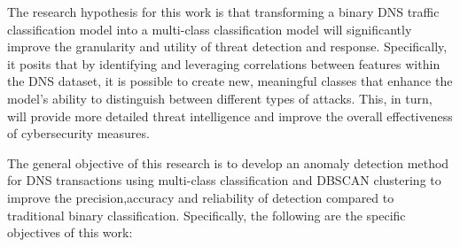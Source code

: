 The research hypothesis for this work is that transforming a binary DNS traffic
classification model into a multi-class classification model will significantly improve the granularity and utility of threat detection and response. Specifically, it
posits that by identifying and leveraging correlations between features within the
DNS dataset, it is possible to create new, meaningful classes that enhance the model’s ability to distinguish between different types of attacks. This, in turn, will
provide more detailed threat intelligence and improve the overall effectiveness of
cybersecurity measures.


 The general objective of this research is to develop an anomaly detection method for DNS transactions using multi-class classification and DBSCAN clustering to improve the precision,accuracy and reliability of detection compared to traditional binary classification. Specifically, the following are the specific objectives of this work:\\

